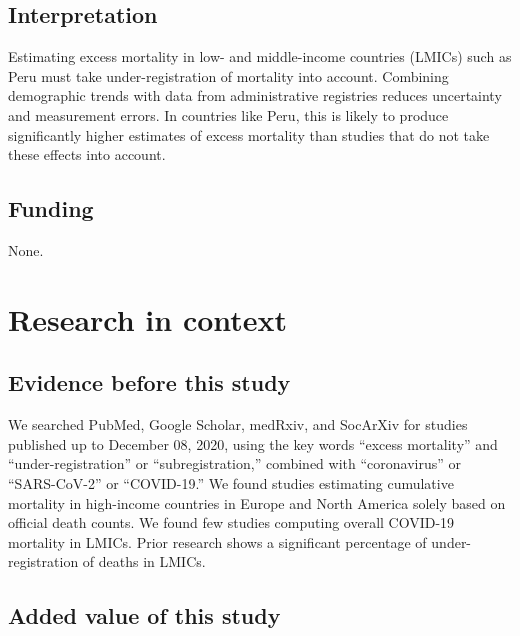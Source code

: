 \documentclass[
]{article}
\begin{document}
\hypertarget{interpretation}{%
\subsection*{Interpretation}\label{interpretation}}

Estimating excess mortality in low- and middle-income countries (LMICs) such as Peru must take under-registration of mortality into account. Combining demographic trends with data from administrative registries reduces uncertainty and measurement errors. In countries like Peru, this is likely to produce significantly higher estimates of excess mortality than studies that do not take these effects into account.

\hypertarget{funding}{%
\subsection*{Funding}\label{funding}}

None.

\hypertarget{research-in-context}{%
\section*{Research in context}\label{research-in-context}}

\hypertarget{evidence-before-this-study}{%
\subsection*{Evidence before this study}\label{evidence-before-this-study}}

We searched PubMed, Google Scholar, medRxiv, and SocArXiv for studies published up to December 08, 2020, using the key words ``excess mortality'' and ``under-registration'' or ``subregistration,'' combined with ``coronavirus'' or ``SARS-CoV-2'' or ``COVID-19.'' We found studies estimating cumulative mortality in high-income countries in Europe and North America solely based on official death counts. We found few studies computing overall COVID-19 mortality in LMICs. Prior research shows a significant percentage of under-registration of deaths in LMICs.

\hypertarget{added-value-of-this-study}{%
\subsection*{Added value of this study}\label{added-value-of-this-study}}
\end{document}

